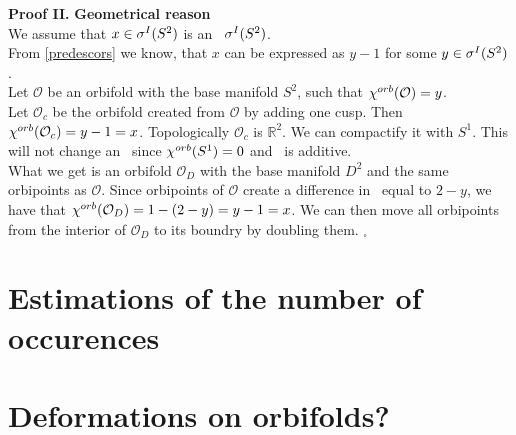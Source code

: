 \textbf{Proof II.}
\textbf{Geometrical reason} \\
We assume that $x \in {\mathcal{\sigma}^I(S^2)}$ is an \apots\ ${\mathcal{\sigma}^I(S^2)}$.\\
From \ref{predescors} we know, that $x$ can be expressed as $y - 1$ for some $y \in {\mathcal{\sigma}^I(S^2)}$. \\
Let $\mathcal{O}$ be an orbifold with the base manifold $S^2$, such that ${\chi^{orb}(\mathcal{O})} 
= y$. \\
Let $\mathcal{O}_c$ be the orbifold created from $\mathcal{O}$ by adding one cusp. 
Then ${\chi^{orb}(\mathcal{O}_c)} = y - 1 = x$. Topologically $\mathcal{O}_c$ is $\mathbb{R}^2$. 
We can compactify it with $S^1$. This will not change an \Eoc\ since ${\chi^{orb}(S^1)} = 0$ and 
\Eoc\ is additive.
\\ What we get is an orbifold $\mathcal{O}_D$ with the base 
manifold $D^2$ and the same 
orbipoints as $\mathcal{O}$. Since orbipoints of $\mathcal{O}$ create a difference 
in \Eoc\ equal to $2-y$, we have that ${\chi^{orb}(\mathcal{O}_D)} = 1 - (2-y) = y - 1 = x$. 
We can then move all orbipoints from the interior of $\mathcal{O}_D$ to its boundry 
by doubling them. $_\square$



\section{Estimations of the number of occurences}









\section{Deformations on orbifolds?}











